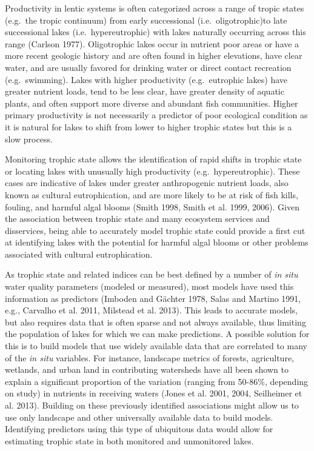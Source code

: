 \documentclass[11pt,]{article}
\begin{document}
Productivity in lentic systems is often categorized across a range of
tropic states (e.g.~the tropic continuum) from early successional
(i.e.~oligotrophic)to late successional lakes (i.e.~hypereutrophic) with
lakes naturally occurring across this range (Carlson 1977). Oligotrophic
lakes occur in nutrient poor areas or have a more recent geologic
history and are often found in higher elevations, have clear water, and
are usually favored for drinking water or direct contact recreation
(e.g.~swimming). Lakes with higher productivity (e.g.~eutrophic lakes)
have greater nutrient loads, tend to be less clear, have greater density
of aquatic plants, and often support more diverse and abundant fish
communities. Higher primary productivity is not necessarily a predictor
of poor ecological condition as it is natural for lakes to shift from
lower to higher trophic states but this is a slow process.

Monitoring trophic state allows the identification of rapid shifts in
trophic state or locating lakes with unusually high productivity
(e.g.~hypereutrophic). These cases are indicative of lakes under greater
anthropogenic nutrient loads, also known as cultural eutrophication, and
are more likely to be at risk of fish kills, fouling, and harmful algal
blooms (Smith 1998, Smith et al. 1999, 2006). Given the association
between trophic state and many ecosystem services and disservices, being
able to accurately model trophic state could provide a first cut at
identifying lakes with the potential for harmful algal blooms or other
problems associated with cultural eutrophication.

As trophic state and related indices can be best defined by a number of
\emph{in situ} water quality parameters (modeled or measured), most
models have used this information as predictors (Imboden and G{ä}chter
1978, Salas and Martino 1991, e.g., Carvalho et al. 2011, Milstead et
al. 2013). This leads to accurate models, but also requires data that is
often sparse and not always available, thus limiting the population of
lakes for which we can make predictions. A possible solution for this is
to build models that use widely available data that are correlated to
many of the \emph{in situ} variables. For instance, landscape metrics of
forests, agriculture, wetlands, and urban land in contributing
watersheds have all been shown to explain a significant proportion of
the variation (ranging from 50-86\%, depending on study) in nutrients in
receiving waters (Jones et al. 2001, 2004, Seilheimer et al. 2013).
Building on these previously identified associations might allow us to
use only landscape and other universally available data to build models.
Identifying predictors using this type of ubiquitous data would allow
for estimating trophic state in both monitored and unmonitored lakes.
\end{document}
